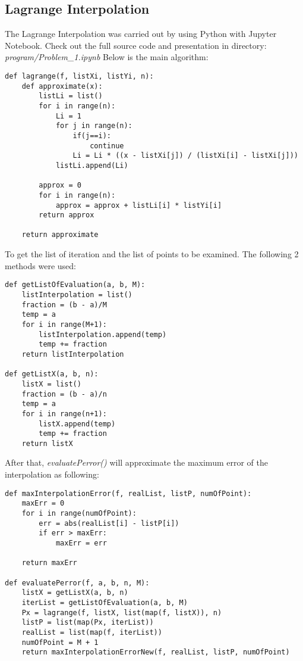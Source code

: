 \subsection{Lagrange Interpolation}
The Lagrange Interpolation was carried out by using Python with Jupyter Notebook. 
Check out the full source code and presentation in directory: \textit{program/Problem\_1.ipynb}
Below is the main algorithm:
\begin{lstlisting}
def lagrange(f, listXi, listYi, n):
    def approximate(x):
        listLi = list()
        for i in range(n):
            Li = 1
            for j in range(n):
                if(j==i):
                    continue
                Li = Li * ((x - listXi[j]) / (listXi[i] - listXi[j]))
            listLi.append(Li)

        approx = 0
        for i in range(n):
            approx = approx + listLi[i] * listYi[i]
        return approx

    return approximate
\end{lstlisting}

To get the list of iteration and the list of points to be examined. The following 2 methods were used:

\begin{lstlisting}
def getListOfEvaluation(a, b, M):
    listInterpolation = list()
    fraction = (b - a)/M
    temp = a
    for i in range(M+1):
        listInterpolation.append(temp)
        temp += fraction
    return listInterpolation

def getListX(a, b, n):
    listX = list()
    fraction = (b - a)/n
    temp = a
    for i in range(n+1):
        listX.append(temp)
        temp += fraction
    return listX
\end{lstlisting}

After that, \textit{evaluatePerror()} will approximate the maximum error of the interpolation as following:

\begin{lstlisting}
def maxInterpolationError(f, realList, listP, numOfPoint):
    maxErr = 0
    for i in range(numOfPoint):
        err = abs(realList[i] - listP[i])
        if err > maxErr:
            maxErr = err

    return maxErr

def evaluatePerror(f, a, b, n, M):
    listX = getListX(a, b, n)
    iterList = getListOfEvaluation(a, b, M)
    Px = lagrange(f, listX, list(map(f, listX)), n)
    listP = list(map(Px, iterList))
    realList = list(map(f, iterList))
    numOfPoint = M + 1
    return maxInterpolationErrorNew(f, realList, listP, numOfPoint)
\end{lstlisting}

